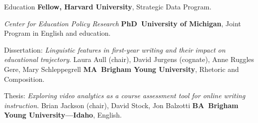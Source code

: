 \begin{rubric}{Education}
\entry*[2023 -- \dots]%
	\textbf{Fellow, Harvard University}, Strategic Data Program.
	\par\emph{Center for Education Policy Research}
%
\entry*[2019 -- 2024]%
	\textbf{PhD~University of Michigan}, Joint Program in English and education.\par
	Dissertation: \emph{Linguistic features in first-year writing and their impact on educational trajectory}. Laura Aull (chair), David Jurgens (cognate), Anne Ruggles Gere, Mary Schleppegrell 
% 
\entry*[2016 -- 2018]%
	\textbf{MA~Brigham Young University}, Rhetoric and Composition.\par
	Thesis: \emph{Exploring video analytics as a course assessment tool for online writing instruction}. Brian Jackson (chair), David Stock, Jon Balzotti
\entry*[2010 -- 2015]%
\textbf{BA~Brigham Young University---Idaho}, English.\par
\end{rubric}